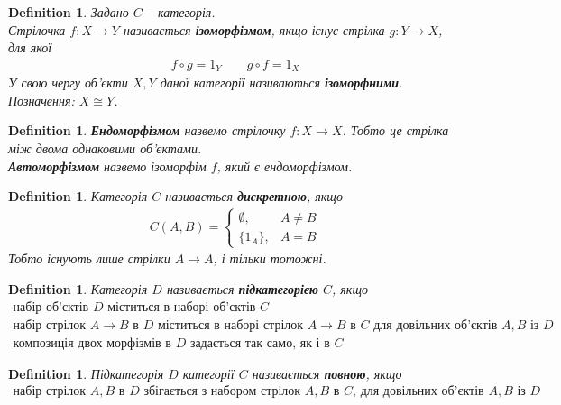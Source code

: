 \documentclass[a4paper, 10pt]{article}
\theoremstyle{theoremdd}
\newtheorem{definition}[theorem]{Definition}
\begin{document}
\begin{definition}
Задано $C$ -- категорія.\\
Стрілочка $f \colon X \to Y$ називається \textbf{ізоморфізмом}, якщо існує стрілка $g \colon Y \to X$, для якої
\begin{align*}
f \circ g = 1_Y \qquad g \circ f = 1_X
\end{align*}
У свою чергу об'єкти $X,Y$ даної категорії називаються \textbf{ізоморфними}.\\
Позначення: $X \cong Y$.
\end{definition}

\begin{definition}
\textbf{Ендоморфізмом} назвемо стрілочку $f \colon X \to X$. Тобто це стрілка між двома однаковими об'єктами.\\
\textbf{Автоморфізмом} назвемо ізоморфім $f$, який є ендоморфізмом.
\end{definition}

\begin{definition}
Категорія $C$ називається \textbf{дискретною}, якщо
\begin{align*}
C(A,B) = \begin{cases} \emptyset, & A \neq B \\ \{1_A\}, & A = B \end{cases}
\end{align*}
Тобто існують лише стрілки $A \to A$, і тільки тотожні.
\end{definition}

\begin{definition}
Категорія $D$ називається \textbf{підкатегорією} $C$, якщо
\begin{align*}
\text{набір об'єктів $D$ міститься в наборі об'єктів $C$} \\
\text{набір стрілок $A \to B$ в $D$ міститься в наборі стрілок $A \to B$ в $C$ для довільних об'єктів $A,B$ із $D$} \\
\text{композиція двох морфізмів в $D$ задається так само, як і в $C$}
\end{align*}
\end{definition}

\begin{definition}
Підкатегорія $D$ категорії $C$ називається \textbf{повною}, якщо
\begin{align*}
\text{набір стрілок $A,B$ в $D$ збігається з набором стрілок $A,B$ в $C$, для довільних об'єктів $A,B$ із $D$}
\end{align*}
\end{definition}
\end{document}
